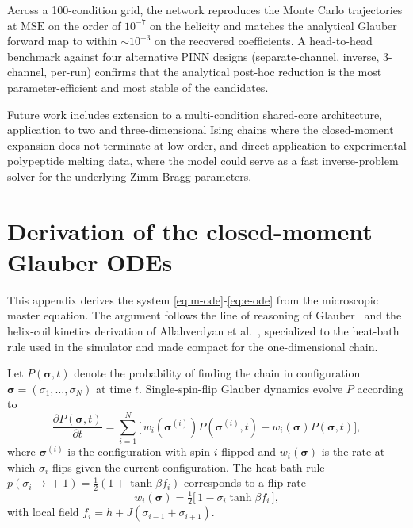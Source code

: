 \documentclass[conference]{IEEEtran}
\begin{document}
Across a 100-condition grid, the network reproduces the Monte Carlo
trajectories at $\mathrm{MSE}$ on the order of $10^{-7}$ on the
helicity and matches the analytical Glauber forward map to within
$\sim\!10^{-3}$ on the recovered coefficients. A head-to-head benchmark
against four alternative PINN designs (separate-channel, inverse,
3-channel, per-run) confirms that the analytical post-hoc reduction is
the most parameter-efficient and most stable of the candidates.

Future work includes extension to a multi-condition shared-core
architecture, application to two and three-dimensional Ising chains
where the closed-moment expansion does not terminate at low order, and
direct application to experimental polypeptide melting data, where the
model could serve as a fast inverse-problem solver for the underlying
Zimm-Bragg parameters.

\FloatBarrier

\appendices

\section{Derivation of the closed-moment Glauber ODEs}
\label{app:moment-ode}

This appendix derives the system
\eqref{eq:m-ode}-\eqref{eq:e-ode} from the microscopic master
equation. The argument follows the line of reasoning of
Glauber~\cite{glauber1963} and the helix-coil kinetics derivation
of Allahverdyan et al.~\cite{allahverdyan2009kinetics}, specialized
to the heat-bath rule used in the simulator and made compact for
the one-dimensional chain.


Let $P(\boldsymbol{\sigma}, t)$ denote the probability of finding the
chain in configuration $\boldsymbol{\sigma} = (\sigma_1, \dots, \sigma_N)$
at time $t$. Single-spin-flip Glauber dynamics evolve $P$ according to
\begin{equation}
  \frac{\partial P(\boldsymbol{\sigma}, t)}{\partial t}
    = \sum_{i=1}^{N} \bigl[\,
        w_i(\boldsymbol{\sigma}^{(i)}) P(\boldsymbol{\sigma}^{(i)}, t)
        - w_i(\boldsymbol{\sigma}) P(\boldsymbol{\sigma}, t)
      \bigr],
  \label{eq:master}
\end{equation}
where $\boldsymbol{\sigma}^{(i)}$ is the configuration with spin $i$
flipped and $w_i(\boldsymbol{\sigma})$ is the rate at which $\sigma_i$
flips given the current configuration. The heat-bath rule
$p(\sigma_i \!\to\! +1) = \tfrac{1}{2}(1 + \tanh \beta f_i)$ corresponds
to a flip rate
\begin{equation}
  w_i(\boldsymbol{\sigma}) = \tfrac{1}{2}\bigl[\,1 - \sigma_i \tanh \beta f_i\,\bigr],
  \label{eq:flip-rate}
\end{equation}
with local field $f_i = h + J(\sigma_{i-1} + \sigma_{i+1})$.
\end{document}
